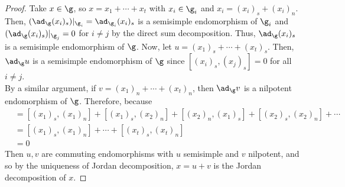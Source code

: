 \documentclass[11pt,leqno,oneside]{amsart}
\numberwithin{thm}{section}
\begin{document}
\begin{proof}
  Take \(x \in \g\), so \(x = x_1 + \cdots + x_t\) with \(x_i \in
  \g_i\) and \(x_i = (x_i)_s + (x_i)_n\). Then, \((\ad_\g (x_i)_s)|_{\g_i} =
  \ad_{\g_i} (x_i)_s\) is a semisimple endomorphism of \(\g_i\) and \((\ad_\g (x_i)_s)|_{\g_j} = 0\) for \(i \neq j\)
  by the direct sum decomposition. Thus, \(\ad_\g (x_i)_s\) is a
  semisimple endomorphism of \(\g\). Now, let \(u = (x_1)_s + \cdots +
  (x_t)_s\). Then, \(\ad_\g u\) is a semisimple endomorphism of \(\g\)
  since \([(x_i)_s, (x_j)_s] = 0\) for all \(i \neq j\). \\

  By a similar argument, if \(v = (x_1)_n + \cdots + (x_t)_n\), then
  \(\ad_\g v\) is a nilpotent endomorphism of \(\g\). Therefore,
  because
  \begin{align*}
    [u,v] & = [(x_1)_s, (x_1)_n] + [(x_1)_s, (x_2)_n] + [(x_2)_n,
            (x_1)_s] + [(x_2)_s, (x_2)_n] + \cdots \\
          & = [(x_1)_s, (x_1)_n] + \cdots + [(x_t)_s, (x_t)_n] \\
          & = 0
  \end{align*}
  Then \(u,v\) are commuting endomorphisms with \(u\) semisimple and
  \(v\) nilpotent, and so by the uniqueness of Jordan decomposition,
  \(x = u+v\) is the Jordan decomposition of \(x\).
\end{proof}
\end{document}
